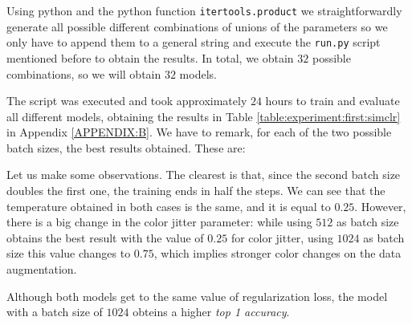 Using python and the python function \lstinline{itertools.product} we straightforwardly generate all possible different combinations of unions of the parameters so we only have to append them to a general string and execute the \lstinline{run.py} script mentioned before to obtain the results. In total, we obtain $32$ possible combinations, so we will obtain $32$ models. 

The script was executed and took approximately $24$ hours to train and evaluate all different models, obtaining the results in Table \ref{table:experiment:first:simclr} in Appendix \ref{APPENDIX:B}. We have to remark, for each of the two possible batch sizes, the best results obtained. These are:

\begin{table}[H]
    \label{table:best:first:simclr}
\centering
{}
\caption{Best results for the grid search experiment with SimCLR.}
\end{table}

Let us make some observations. The clearest is that, since the second batch size doubles the first one, the training ends in half the steps. We can see that the temperature obtained in both cases is the same, and it is equal to $0.25$. However, there is a big change in the color jitter parameter: while using $512$ as batch size obtains the best result with the value of $0.25$ for color jitter, using $1024$ as batch size this value changes to $0.75$, which implies stronger color changes on the data augmentation. 

Although both models get to the same value of regularization loss, the model with a batch size of $1024$ obteins a higher \emph{top 1 accuracy}.